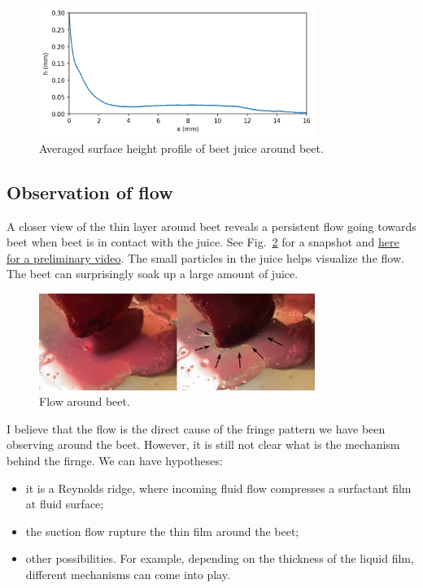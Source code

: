 \documentclass[12pt]{article}
\begin{document}
\begin{figure}
    \centering
    \includegraphics[width=0.8\textwidth]{Figures/beet_in_juice_dimple_04222024.pdf}
    \caption{Averaged surface height profile of beet juice around beet.}
    \label{fig:beet_in_juice_dimple_04222024}
\end{figure}

\subsection{Observation of flow}

A closer view of the thin layer around beet reveals a persistent flow going towards beet when beet is in contact with the juice. See Fig.~\ref{fig:flow_around_beet} for a snapshot and \href{https://drive.google.com/open?id=15En0p7fjopaUQokh8Cz-kZCVPX3ptZaZ&usp=drive_fs}{here for a preliminary video}. The small particles in the juice helps visualize the flow. The beet can surprisingly soak up a large amount of juice. 

\begin{figure}
    \centering
    \includegraphics[width=0.8\textwidth]{Figures/flow_around_beet.pdf}
    \caption{Flow around beet.}
    \label{fig:flow_around_beet}
\end{figure}

I believe that the flow is the direct cause of the fringe pattern we have been observing around the beet. However, it is still not clear what is the mechanism behind the firnge. We can have hypotheses:

\begin{itemize}
    \item it is a Reynolds ridge, where incoming fluid flow compresses a surfactant film at fluid surface;
    \item the suction flow rupture the thin film around the beet;
    \item other possibilities. For example, depending on the thickness of the liquid film, different mechanisms can come into play. 
\end{itemize}
\end{document}
